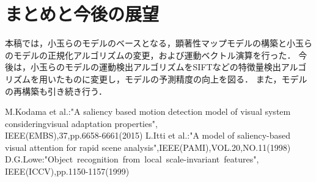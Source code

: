 \vspace{-3.5mm}

\section{まとめと今後の展望}
\vspace{-2.0mm}
本稿では，小玉らのモデルのベースとなる，顕著性マップモデルの構築と小玉らのモデルの正規化アルゴリズムの変更，および運動ベクトル演算を行った．
今後は，小玉らのモデルの運動検出アルゴリズムをSIFTなどの特徴量検出アルゴリズムを用いたものに変更し，モデルの予測精度の向上を図る．
また，モデルの再構築も引き続き行う．

\vspace{-4.0mm}
\begin{thebibliography}{}
\vspace{-1.5mm}
\scriptsize{
M.Kodama et al.:"A saliency based motion detection model of visual system consideringvisual adaptation properties",\\IEEE(EMBS),37,pp.6658-6661(2015)
L.Itti et al.:"A model of saliency-based visual attention for rapid scene analysis",IEEE(PAMI),VOL.20,NO.11(1998)
D.G.Lowe:"Object~recognition~from~local~scale-invariant~features",\\IEEE(ICCV),pp.1150-1157(1999)
}
\end{thebibliography}